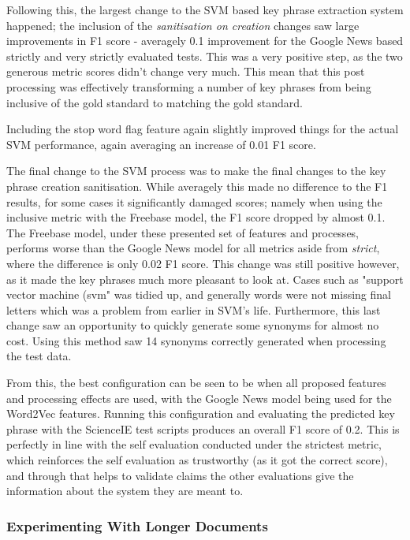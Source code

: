 Following this, the largest change to the SVM based key phrase extraction system happened; the inclusion of the \textit{sanitisation on creation} changes saw large improvements in F1 score - averagely 0.1 improvement for the Google News based strictly and very strictly evaluated tests. This was a very positive step, as the two generous metric scores didn't change very much. This mean that this post processing was effectively transforming a number of key phrases from being inclusive of the gold standard to matching the gold standard. 

Including the stop word flag feature again slightly improved things for the actual SVM performance, again averaging an increase of 0.01 F1 score.

The final change to the SVM process was to make the final changes to the key phrase creation sanitisation. While averagely this made no difference to the F1 results, for some cases it significantly damaged scores; namely when using the inclusive metric with the Freebase model, the F1 score dropped by almost 0.1. The Freebase model, under these presented set of features and processes, performs worse than the Google News model for all metrics aside from \textit{strict}, where the difference is only 0.02 F1 score. This change was still positive however, as it made the key phrases much more pleasant to look at. Cases such as "support vector machine (svm" was tidied up, and generally words were not missing final letters which was a problem from earlier in SVM's life. Furthermore, this last change saw an opportunity to quickly generate some synonyms for almost no cost. Using this method saw 14 synonyms correctly generated when processing the test data. 

From this, the best configuration can be seen to be when all proposed features and processing effects are used, with the Google News model being used for the Word2Vec features. Running this configuration and evaluating the predicted key phrase with the ScienceIE test scripts produces an overall F1 score of 0.2. This is perfectly in line with the self evaluation conducted under the strictest metric, which reinforces the self evaluation as trustworthy (as it got the correct score), and through that helps to validate claims the other evaluations give the information about the system they are meant to. 

\subsubsection{Experimenting With Longer Documents}

